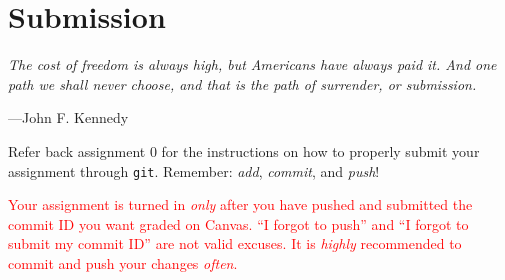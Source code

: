 \section{Submission}
\epigraph{\emph{The cost of freedom is always high, but Americans have always paid it. And one path we shall never choose, and that is the path of surrender, or submission.}}{---John F. Kennedy}

\noindent
Refer back assignment 0 for the instructions on how to properly submit
your assignment through \texttt{git}. Remember: \emph{add},
\emph{commit}, and \emph{push}!

\textcolor{red}{Your assignment is turned in \emph{only} after you have
pushed and submitted the commit ID you want graded on Canvas. ``I
forgot to push'' and ``I forgot to submit my commit ID'' are not valid
excuses. It is \emph{highly} recommended to commit and push your changes
\emph{often}.}
